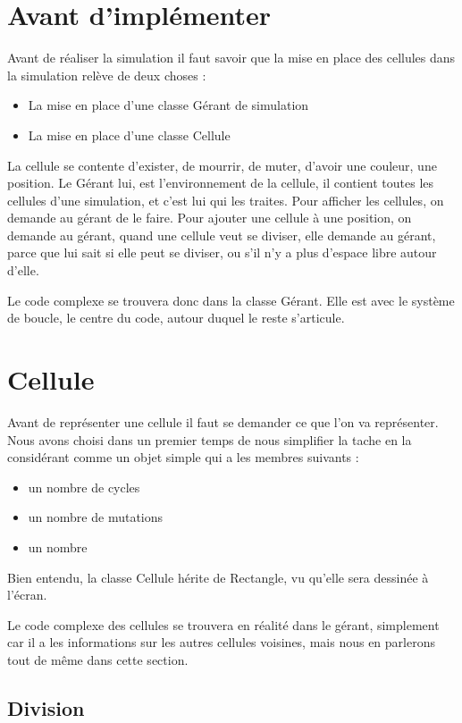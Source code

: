 \section{Avant d'implémenter}
Avant de réaliser la simulation il faut savoir que 
la mise en place des cellules dans la simulation relève de deux choses : 
\begin{itemize}
	\item La mise en place d'une classe Gérant de simulation
	\item La mise en place d'une classe Cellule
\end{itemize}

La cellule se contente d'exister, de mourrir, de muter, d'avoir une couleur, une position. Le Gérant lui, est l'environnement de la cellule, il contient toutes les cellules d'une simulation, et c'est lui qui les traites. Pour afficher les cellules, on demande au gérant de le faire. Pour ajouter une cellule à une position, on demande au gérant, quand une cellule veut se diviser, elle demande au gérant, parce que lui sait si elle peut se diviser, ou s'il n'y a plus d'espace libre autour d'elle.

Le code complexe se trouvera donc dans la classe Gérant. Elle est avec le système de boucle, le centre du code, autour duquel le reste s'articule.

\section{Cellule}
Avant de représenter une cellule il faut se demander ce que l'on va représenter. Nous avons choisi dans un premier temps de nous simplifier la tache en la considérant comme un objet simple qui a les membres suivants : 
\begin{itemize}
	\item un nombre de cycles
	\item un nombre de mutations
	\item un nombre 
\end{itemize}

Bien entendu, la classe Cellule hérite de Rectangle, vu qu'elle sera dessinée à l'écran.

Le code complexe des cellules se trouvera en réalité dans le gérant, simplement car il a les informations sur les autres cellules voisines, mais nous en parlerons tout de même dans cette section.

\subsection{Division}

